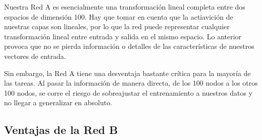 

Nuestra Red A es esencialmente una transformación lineal completa entre dos espacios de dimensión 100. Hay 
que tomar en cuenta que la actiavición de nuestras capas son lineales, por lo que la red puede representar
cualquier transformación lineal entre entrada y salida en el mismo espacio. Lo anterior provoca que no se
pierda información o detalles de las características de nuestros vectores de entrada. 

Sin embargo, la Red A tiene una desventaja bastante crítica para la mayoría de las tareas. Al pasar la 
información de manera directa, de los 100 nodos a los otros 100 nodos, se corre el riesgo de sobreajustar
el entrenamiento a nuestros datos y no llegar a generalizar en absoluto. 

\subsection{Ventajas de la Red B}



